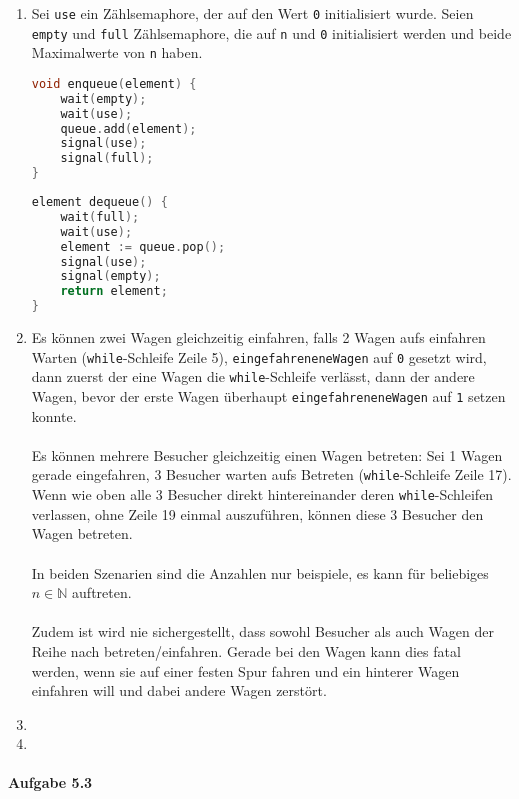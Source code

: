 \documentclass[11pt]{article}
\begin{document}
\begin{enumerate}[label=\alph*)]
\item Sei \verb|use| ein Zählsemaphore, der auf den Wert \verb|0| initialisiert wurde. Seien \verb|empty| und \verb|full| Zählsemaphore, die auf \verb|n| und \verb|0| initialisiert werden und beide Maximalwerte von \verb|n| haben.
\begin{lstlisting}[language=C]
void enqueue(element) {
	wait(empty);
	wait(use);
	queue.add(element);
	signal(use);
	signal(full);
}
\end{lstlisting}

\begin{lstlisting}[language=C]
element dequeue() {
	wait(full);
	wait(use);
	element := queue.pop();
	signal(use);
	signal(empty);
	return element;
}
\end{lstlisting}

\item Es können zwei Wagen gleichzeitig einfahren, falls 2 Wagen aufs einfahren Warten (\verb|while|-Schleife Zeile 5), \verb|eingefahreneneWagen| auf \verb|0| gesetzt wird, dann zuerst der eine Wagen die \verb|while|-Schleife verlässt, dann der andere Wagen, bevor der erste Wagen überhaupt \verb|eingefahreneneWagen| auf \verb|1| setzen konnte.
\\\\Es können mehrere Besucher gleichzeitig einen Wagen betreten: Sei 1 Wagen gerade eingefahren, 3 Besucher warten aufs Betreten (\verb|while|-Schleife Zeile 17). Wenn wie oben alle 3 Besucher direkt hintereinander deren \verb|while|-Schleifen verlassen, ohne Zeile 19 einmal auszuführen, können diese 3 Besucher den Wagen betreten.
\\\\In beiden Szenarien sind die Anzahlen nur beispiele, es kann für beliebiges $n\in\mathbb{N}$ auftreten.
\\\\Zudem ist wird nie sichergestellt, dass sowohl Besucher als auch Wagen der Reihe nach betreten/einfahren. Gerade bei den Wagen kann dies fatal werden, wenn sie auf einer festen Spur fahren und ein hinterer Wagen einfahren will und dabei andere Wagen zerstört.

\item 

\item

\end{enumerate}


\paragraph{Aufgabe 5.3}
\end{document}
